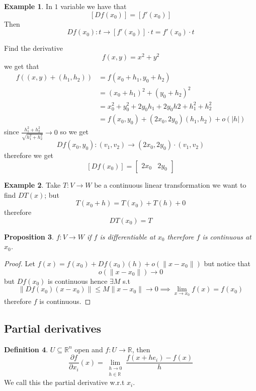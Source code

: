 \documentclass[11pt,a4paper]{article}
\theoremstyle{definition}
\newtheorem{definition}{Definition}[section]
\newtheorem{example}[definition]{Example}
\theoremstyle{plain}
\newtheorem{proposition}[definition]{Proposition}
\theoremstyle{remark}
\newcommand{\R}{\mathbb{R}}
\newcommand{\norm}[1]{\lVert #1 \rVert}
\begin{document}
\begin{example}
    In $1$ variable we have that 
    $$[Df(x_0)] = [f'(x_0)]$$
    Then 
    $$Df(x_0) \colon t \to [f'(x_0)] \cdot t = f'(x_0) \cdot t$$

    Find the derivative 
    $$f(x, y) = x^2 + y^2$$
    we get that 
    \begin{align*}
        f((x,y) + (h_1, h_2)) &= f(x_0 + h_1, y_0 + h_2) \\
        &= (x_0 + h_1)^2 + (y_0 + h_2)^2 \\
        &= x_0^2 + y_0^2 + 2 y_0 h_1 + 2y_0 h2 + h_1^2 + h_2^2 \\
        &= f(x_0, y_0) + (2x_0, 2y_0) (h_1, h_2) + o(|h|)
    \end{align*}
    since $\frac{h_1^2 + h_2^2}{\sqrt{h_1^2 + h_2^2}} \to 0$ so we get 
    $$Df(x_0, y_0) \colon (v_1, v_2) \to (2x_0, 2y_0) \cdot (v_1, v_2)$$
    therefore we get 
    $$[Df(x_0)] = \begin{bmatrix}
        2x_0 & 2y_0
    \end{bmatrix}$$
\end{example}

\begin{example}
    Take $T \colon V \to W$ be a continuous linear transformation we want to find $DT(x)$; but 
    $$T(x_0 + h) = T(x_0) + T(h) + 0$$
    therefore 
    $$DT(x_0) = T$$
\end{example}

\begin{proposition}
    $f \colon V \to W$ if $f$ is differentiable at $x_0$ therefore $f$ is continuous at $x_0$. 
\end{proposition}

\begin{proof}
    Let $f(x) = f(x_0) + Df(x_0) (h) + o(\norm{x - x_0})$ but notice that 
    $$o(\norm{x - x_0}) \to 0$$
    but $Df(x_0)$ is continuous hence $\exists M$ s.t 
    $$\norm{Df(x_0) (x-x_0)} \le M \norm{x-x_0} \to 0 \implies \lim_{x \to x_0} f(x) = f(x_0)$$ 
    therefore $f$ is continuous. 
\end{proof}
\subsection{Partial derivatives} 

\begin{definition}
    $U \subseteq \R^n$ open and $f \colon U \to \R$, then 
    $$\frac{\partial f}{\partial x_i} (x) = \lim_{\substack{h \to 0 \\ h \in \R}} \frac{f(x + he_i) - f(x)}{h}$$
    We call this the partial derivative w.r.t $x_i$. 
\end{definition}
\end{document}
